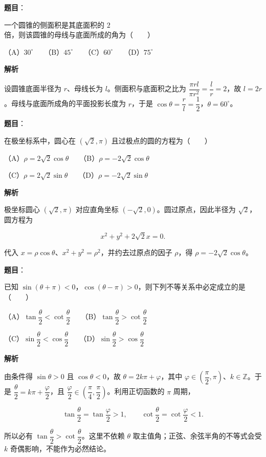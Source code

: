 \begin{answer}

\textbf{题目}：

一个圆锥的侧面积是其底面积的 $2$ 倍，则该圆锥的母线与底面所成的角为\mbox{（　　）}

（A）$30^\circ$　　（B）$45^\circ$　　（C）$60^\circ$　　（D）$75^\circ$

\textbf{解析}

设圆锥底面半径为 $r$、母线长为 $l$。侧面积与底面积之比为 $\dfrac{\pi rl}{\pi r^2}=\dfrac lr=2$，故 $l=2r$。母线与底面所成角的平面投影长度为 $r$，于是 $\cos\theta=\dfrac rl=\dfrac12$，$\theta=60^\circ$。


\end{answer}
\begin{answer}

\textbf{题目}：

在极坐标系中，圆心在 $(\sqrt2,\pi)$ 且过极点的圆的方程为\mbox{（　　）}

（A）$\rho=2\sqrt2\cos\theta$　　（B）$\rho=-2\sqrt2\cos\theta$

（C）$\rho=2\sqrt2\sin\theta$　　（D）$\rho=-2\sqrt2\sin\theta$

\textbf{解析}

极坐标圆心 $(\sqrt2,\pi)$ 对应直角坐标 $(-\sqrt2,0)$。圆过原点，因此半径为 $\sqrt2$，圆方程为

\nopagebreak[4]
\[x^2+y^2+2\sqrt2x=0.\]

代入 $x=\rho\cos\theta$、$x^2+y^2=\rho^2$，并约去过原点的因子 $\rho$，得 $\rho=-2\sqrt2\cos\theta$。


\end{answer}
\begin{answer}

\textbf{题目}：

已知 $\sin(\theta+\pi)<0$，$\cos(\theta-\pi)>0$，则下列不等关系中必定成立的是\mbox{（　　）}

（A）$\tan\dfrac\theta2<\cot\dfrac\theta2$　　（B）$\tan\dfrac\theta2>\cot\dfrac\theta2$

（C）$\sin\dfrac\theta2<\cos\dfrac\theta2$　　（D）$\sin\dfrac\theta2>\cos\dfrac\theta2$

\textbf{解析}

由条件得 $\sin\theta>0$ 且 $\cos\theta<0$，故 $\theta=2k\pi+\varphi$，其中 $\varphi\in(\dfrac\pi2,\pi)$、$k\in\mathbb Z$。于是 $\dfrac\theta2=k\pi+\dfrac\varphi2$，且 $\dfrac\varphi2\in(\dfrac\pi4,\dfrac\pi2)$。利用正切函数的 $\pi$ 周期，

\nopagebreak[4]
\[
\tan\frac\theta2=\tan\frac\varphi2>1,
\qquad
\cot\frac\theta2=\cot\frac\varphi2<1.
\]

所以必有 $\tan\dfrac\theta2>\cot\dfrac\theta2$。这里不依赖 $\theta$ 取主值角；正弦、余弦半角的不等式会受 $k$ 奇偶影响，不能作为必然结论。


\end{answer}
